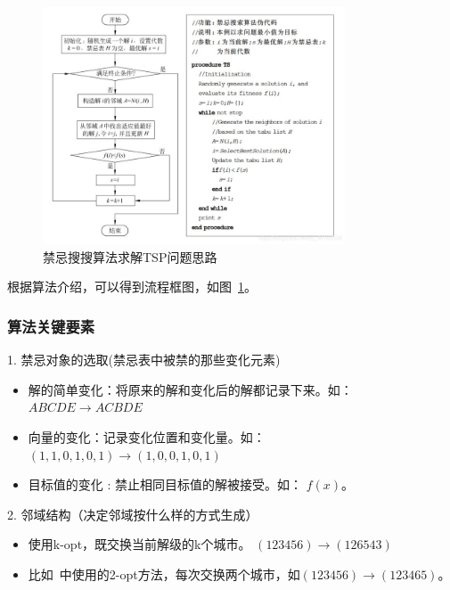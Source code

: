 \documentclass[lang=cn,11pt]{elegantpaper}
\begin{document}
\begin{figure}[h]
  \centering
  \includegraphics[width=0.8\textwidth]{figure/禁忌搜索算法流程.jpg} %
  \caption{禁忌搜搜算法求解TSP问题思路 } %
   \label{tabsearch}
\end{figure}

根据算法介绍，可以得到流程框图，如图~\ref{tabsearch}。

\subsubsection{算法关键要素}
1. 禁忌对象的选取(禁忌表中被禁的那些变化元素)

        \begin{itemize}[leftmargin=50pt]
        \item 解的简单变化：将原来的解和变化后的解都记录下来。如：$ABCDE \rightarrow ACBDE  $
        \item 向量的变化：记录变化位置和变化量。如：
            $(1,1,0,1,0,1) \rightarrow (1,0,0,1,0,1)    $
        \item 目标值的变化 : 禁止相同目标值的解被接受。如：
            $f(x)$。
        \end{itemize}

2. 邻域结构（决定邻域按什么样的方式生成）
        \begin{itemize}[leftmargin=50pt]
        \item 使用k-opt，既交换当前解级的k个城市。
            $(123456) \rightarrow (126543)    $
        \item 比如~\cite{2opt}中使用的2-opt方法，每次交换两个城市，如$(123456) \rightarrow (123465)    $。
        \end{itemize}
\end{document}
